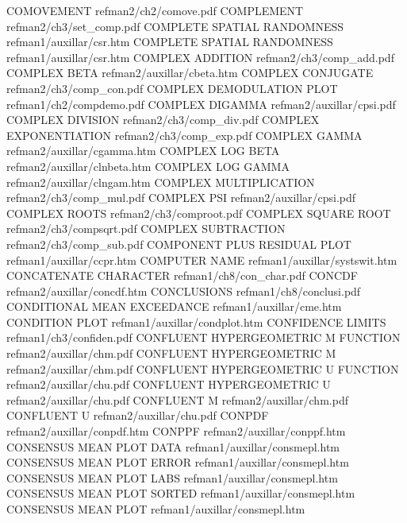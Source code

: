 COMOVEMENT                              refman2/ch2/comove.pdf
COMPLEMENT                              refman2/ch3/set_comp.pdf
COMPLETE SPATIAL RANDOMNESS             refman1/auxillar/csr.htm
COMPLETE SPATIAL RANDOMNESS             refman1/auxillar/csr.htm
COMPLEX ADDITION                        refman2/ch3/comp_add.pdf
COMPLEX BETA                            refman2/auxillar/cbeta.htm
COMPLEX CONJUGATE                       refman2/ch3/comp_con.pdf
COMPLEX DEMODULATION PLOT               refman1/ch2/compdemo.pdf
COMPLEX DIGAMMA                         refman2/auxillar/cpsi.pdf
COMPLEX DIVISION                        refman2/ch3/comp_div.pdf
COMPLEX EXPONENTIATION                  refman2/ch3/comp_exp.pdf
COMPLEX GAMMA                           refman2/auxillar/cgamma.htm
COMPLEX LOG BETA                        refman2/auxillar/clnbeta.htm
COMPLEX LOG GAMMA                       refman2/auxillar/clngam.htm
COMPLEX MULTIPLICATION                  refman2/ch3/comp_mul.pdf
COMPLEX PSI                             refman2/auxillar/cpsi.pdf
COMPLEX ROOTS                           refman2/ch3/comproot.pdf
COMPLEX SQUARE ROOT                     refman2/ch3/compsqrt.pdf
COMPLEX SUBTRACTION                     refman2/ch3/comp_sub.pdf
COMPONENT PLUS RESIDUAL PLOT            refman1/auxillar/ccpr.htm
COMPUTER NAME                           refman1/auxillar/systswit.htm
CONCATENATE CHARACTER                   refman1/ch8/con_char.pdf
CONCDF                                  refman2/auxillar/concdf.htm
CONCLUSIONS                             refman1/ch8/conclusi.pdf
CONDITIONAL MEAN EXCEEDANCE             refman1/auxillar/cme.htm
CONDITION PLOT                          refman1/auxillar/condplot.htm
CONFIDENCE LIMITS                       refman1/ch3/confiden.pdf
CONFLUENT HYPERGEOMETRIC M FUNCTION     refman2/auxillar/chm.pdf
CONFLUENT HYPERGEOMETRIC M              refman2/auxillar/chm.pdf
CONFLUENT HYPERGEOMETRIC U FUNCTION     refman2/auxillar/chu.pdf
CONFLUENT HYPERGEOMETRIC U              refman2/auxillar/chu.pdf
CONFLUENT M                             refman2/auxillar/chm.pdf
CONFLUENT U                             refman2/auxillar/chu.pdf
CONPDF                                  refman2/auxillar/conpdf.htm
CONPPF                                  refman2/auxillar/conppf.htm
CONSENSUS MEAN PLOT DATA                refman1/auxillar/consmepl.htm
CONSENSUS MEAN PLOT ERROR               refman1/auxillar/consmepl.htm
CONSENSUS MEAN PLOT LABS                refman1/auxillar/consmepl.htm
CONSENSUS MEAN PLOT SORTED              refman1/auxillar/consmepl.htm
CONSENSUS MEAN PLOT                     refman1/auxillar/consmepl.htm
